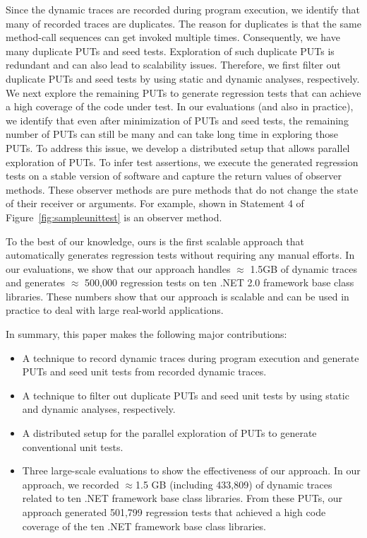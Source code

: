 Since the dynamic traces are recorded during program execution, 
we identify that many of recorded traces are duplicates. The 
reason for duplicates is that the same method-call sequences
can get invoked multiple times. Consequently, we have many duplicate PUTs and seed tests. 
Exploration of such duplicate PUTs is redundant and can also
lead to scalability issues. Therefore, we first filter
out duplicate PUTs and seed tests by using static and 
dynamic analyses, respectively. We next explore the remaining
PUTs to generate regression tests that can achieve a high coverage
of the code under test. In our evaluations (and also in practice), 
we identify that even after minimization of PUTs and seed tests, 
the remaining number of PUTs can still be many and can take long
time in exploring those PUTs. To address this issue, we develop a 
distributed setup that allows parallel exploration of PUTs.
To infer test assertions, we execute the generated regression
tests on a stable version of software and capture the return values
of observer methods. These observer methods are pure methods
that do not change the state of their receiver or arguments. For example,
 shown in Statement 4 of Figure~\ref{fig:sampleunittest} is
an observer method.

To the best of our knowledge, ours is the first scalable
approach that automatically generates regression tests without 
requiring any manual efforts. In our evaluations, we show that our approach handles 
$\approx$ 1.5GB of dynamic traces and generates $\approx$ 500,000 regression tests
on ten .NET 2.0 framework base class libraries. These numbers show that our approach
is scalable and can be used in practice to deal with large real-world applications.

In summary, this paper makes the following major contributions:

\begin{itemize}
\item A technique to record dynamic traces during program execution and generate PUTs and seed
unit tests from recorded dynamic traces.
\item A technique to filter out duplicate PUTs and seed unit tests by 
using static and dynamic analyses, respectively.
\item A distributed setup for the parallel exploration of PUTs to generate conventional
unit tests.
\item Three large-scale evaluations to show the effectiveness of our approach. 
In our approach, we recorded $\approx$1.5 GB (including 433,809) of dynamic traces related
to ten .NET framework base class libraries. From these PUTs,
our approach generated 501,799 regression tests that achieved a
high code coverage of the ten .NET framework base class libraries. 
\end{itemize}

